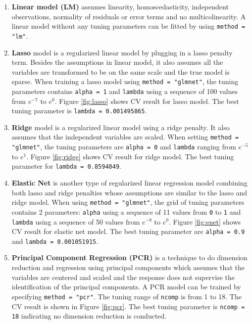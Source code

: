 \documentclass[11pt]{article}
\begin{document}
\begin{enumerate}

\item \textbf{Linear model (LM)} assumes linearity, homoscedasticity, independent observations, normality of residuals or error terms and no multicolinearity. A linear model without any tuning parameters can be fitted by using \texttt{method = "lm"}.

\item \textbf{Lasso} model is a regularized linear model by plugging in a lasso penalty term. Besides the assumptions in linear model, it also assumes all the variables are transformed to be on the same scale and the true model is sparse. When training a lasso model using \texttt{method = "glmnet"}, the tuning parameters contains \texttt{alpha = 1} and \texttt{lambda} using a sequence of 100 values from $e^{-7}$ to $e^0$. Figure \ref{fig:lasso} shows CV result for lasso model. The best tuning parameter is \texttt{lambda = 0.001495865}.

\item \textbf{Ridge} model is a regularized linear model using a ridge penalty. It also assumes that the independent variables are scaled. When setting \texttt{method = "glmnet"}, the tuning parameters are \texttt{alpha = 0} and \texttt{lambda} ranging from $e^{-5}$ to $e^1$. Figure \ref{fig:ridge} shows CV result for ridge model. The best tuning parameter for \texttt{lambda = 0.8594049}.

\item \textbf{Elastic Net} is another type of regularized linear regression model combining both lasso and ridge penalties whose assumptions are similar to the lasso and ridge model. When using \texttt{method = "glmnet"}, the grid of tuning parameters contains 2 parameters: \texttt{alpha} using a sequence of 11 values from \texttt{0} to \texttt{1} and \texttt{lambda} using a sequence of 50 values from $e^{-8}$ to $e^0$. Figure \ref{fig:enet} shows CV result for elastic net model. The best tuning parameter are \texttt{alpha = 0.9} and \texttt{lambda = 0.001051915}.

\item \textbf{Principal Component Regression (PCR)} is a technique to do dimension reduction and regression using principal components which assumes that the variables are centered and scaled and the response does not supervise the identification of the principal components. A PCR model can be trained by specifying \texttt{method = "pcr"}. The tuning range of \texttt{ncomp} is from 1 to 18. The CV result is shown in Figure \ref{fig:pcr}. The best tuning parameter is \texttt{ncomp = 18} indicating no dimension reduction is conducted.



\end{enumerate}
\end{document}

